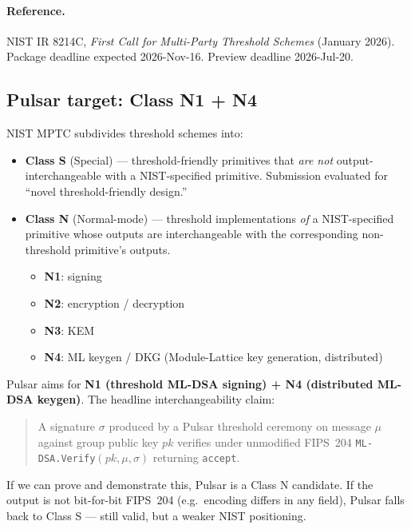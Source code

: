 
\paragraph{Reference.}
NIST IR 8214C, \emph{First Call for Multi-Party Threshold Schemes}
(January 2026). Package deadline expected 2026-Nov-16. Preview
deadline 2026-Jul-20.

\subsection{Pulsar target: Class N1 + N4}

NIST MPTC subdivides threshold schemes into:

\begin{itemize}[leftmargin=*, itemsep=0pt]
\item \textbf{Class S} (Special) --- threshold-friendly primitives
that \emph{are not} output-interchangeable with a NIST-specified
primitive. Submission evaluated for ``novel threshold-friendly
design.''
\item \textbf{Class N} (Normal-mode) --- threshold implementations
\emph{of} a NIST-specified primitive whose outputs are
interchangeable with the corresponding non-threshold primitive's
outputs.
  \begin{itemize}[leftmargin=*, itemsep=0pt]
  \item \textbf{N1}: signing
  \item \textbf{N2}: encryption / decryption
  \item \textbf{N3}: KEM
  \item \textbf{N4}: ML keygen / DKG (Module-Lattice key generation,
  distributed)
  \end{itemize}
\end{itemize}

Pulsar aims for \textbf{N1 (threshold ML-DSA signing) + N4
(distributed ML-DSA keygen)}. The headline interchangeability claim:

\begin{quote}
A signature $\sigma$ produced by a Pulsar threshold ceremony on
message $\mu$ against group public key $\mathit{pk}$ verifies under
unmodified FIPS~204 \texttt{ML-DSA.Verify}$(\mathit{pk}, \mu,
\sigma)$ returning \texttt{accept}.
\end{quote}

If we can prove and demonstrate this, Pulsar is a Class N
candidate. If the output is not bit-for-bit FIPS~204 (e.g.\ encoding
differs in any field), Pulsar falls back to Class S --- still
valid, but a weaker NIST positioning.

